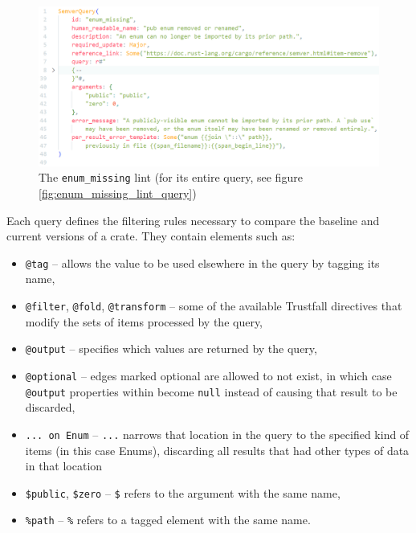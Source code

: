 \documentclass[licencjacka,en]{pracamgr}
\begin{document}
\begin{figure}[h]
	\centering
	\includegraphics[width=\linewidth]{lint-example.png}
	\caption{The \texttt{enum\_missing} lint (for its entire query, see figure
		\ref{fig:enum_missing_lint_query})}
	\label{fig:enum_missing_lint}
\end{figure}

Each query defines the filtering rules necessary to compare the baseline and current versions of
a crate. They contain elements such as:
\begin{itemize}
	\item \texttt{@tag} -- allows the value to be used elsewhere in the query by
		tagging its name,
	\item \texttt{@filter}, \texttt{@fold}, \texttt{@transform} -- some of the available Trustfall
		directives that modify the sets of items processed by the query,
	\item \texttt{@output} -- specifies which values are returned by the query,
	\item \texttt{@optional} -- edges marked optional are allowed to not exist, in which case
		\texttt{@output} properties within become \texttt{null} instead of causing that result
		to be discarded,
	\item \texttt{... on Enum} -- \texttt{...} narrows that location in the query to the specified
		kind of items (in this case Enums), discarding all results that had other types of data
		in that location
	\item \texttt{\$public}, \texttt{\$zero} -- \texttt{\$} refers to the argument with the same
		name,
	\item \texttt{\%path} -- \texttt{\%} refers to a tagged element with the same name.
\end{itemize}
\end{document}
